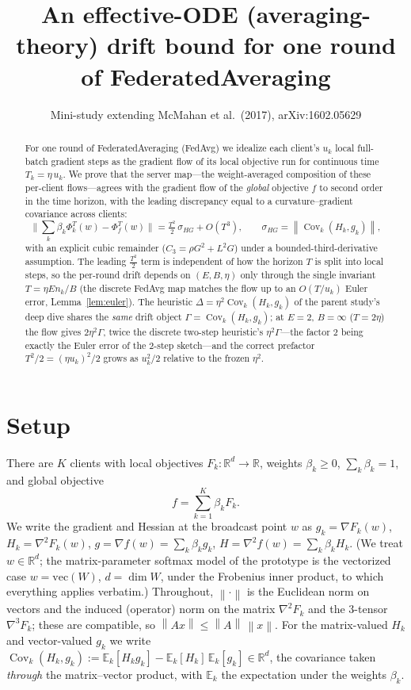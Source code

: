 \documentclass[11pt]{article}
\title{An effective-ODE (averaging-theory) drift bound for one round of
FederatedAveraging}
\author{Mini-study extending McMahan et al.\ (2017), arXiv:1602.05629}
\date{}
\theoremstyle{definition}
\newcommand{\R}{\mathbb{R}}
\newcommand{\norm}[1]{\left\lVert#1\right\rVert}
\newcommand{\grad}{\nabla}
\newcommand{\Cov}{\operatorname{Cov}}
\begin{document}
\maketitle

\begin{abstract}
For one round of FederatedAveraging (FedAvg) we idealize each client's $u_k$
local full-batch gradient steps as the gradient flow of its local objective run
for continuous time $T_k=\eta\,u_k$. We prove that the server map---the
weight-averaged composition of these per-client flows---agrees with the gradient
flow of the \emph{global} objective $f$ to second order in the time horizon, with
the leading discrepancy equal to a curvature--gradient covariance across clients:
\[
\Big\|\sum_k\beta_k\Phi_k^{T}(w)-\Phi_f^{T}(w)\Big\|
=\tfrac{T^2}{2}\,\sigma_{HG}+O(T^3),
\qquad
\sigma_{HG}=\norm{\Cov_k(H_k,g_k)},
\]
with an explicit cubic remainder ($C_3=\rho G^2+L^2G$) under a bounded-third-derivative assumption.
The leading $\tfrac{T^2}{2}$ term is independent of how the horizon $T$ is split into local steps, so the per-round drift depends on $(E,B,\eta)$ only through the single invariant $T=\eta E n_k/B$ (the discrete FedAvg map matches the flow up to an $O(T/u_k)$ Euler error, Lemma~\ref{lem:euler}). The heuristic
$\Delta=\eta^2\Cov_k(H_k,g_k)$ of the parent study's deep dive shares the \emph{same} drift object $\Gamma=\Cov_k(H_k,g_k)$; at $E=2$, $B=\infty$ ($T=2\eta$) the flow gives $2\eta^2\Gamma$, twice the discrete two-step heuristic's $\eta^2\Gamma$---the factor $2$ being exactly the Euler error of the $2$-step sketch---and the correct prefactor $T^2/2=(\eta u_k)^2/2$ grows as $u_k^2/2$ relative to the frozen $\eta^2$.
\end{abstract}

\section{Setup}

There are $K$ clients with local objectives $F_k:\R^d\to\R$, weights
$\beta_k\ge 0$, $\sum_k\beta_k=1$, and global objective
\[
f=\sum_{k=1}^K\beta_k F_k .
\]
We write the gradient and Hessian at the broadcast point $w$ as
$g_k=\grad F_k(w)$, $H_k=\grad^2 F_k(w)$, $g=\grad f(w)=\sum_k\beta_k g_k$,
$H=\grad^2 f(w)=\sum_k\beta_k H_k$. (We treat $w\in\R^d$; the matrix-parameter
softmax model of the prototype is the vectorized case $w=\mathrm{vec}(W)$,
$d=\dim W$, under the Frobenius inner product, to which everything applies
verbatim.) Throughout, $\norm{\cdot}$ is the Euclidean norm on vectors and the
induced (operator) norm on the matrix $\grad^2 F_k$ and the $3$-tensor
$\grad^3 F_k$; these are compatible, so $\norm{Ax}\le\norm{A}\,\norm{x}$. For the
matrix-valued $H_k$ and vector-valued $g_k$ we write
$\Cov_k(H_k,g_k):=\mathbb E_k[H_kg_k]-\mathbb E_k[H_k]\,\mathbb E_k[g_k]\in\R^d$,
the covariance taken \emph{through} the matrix--vector product, with
$\mathbb E_k$ the expectation under the weights $\beta_k$.
\end{document}
